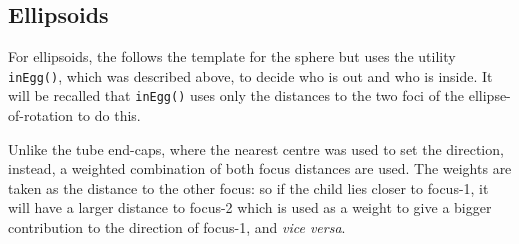 \subsection{Ellipsoids}

For ellipsoids, the  follows the template for the sphere but uses the utility {\tt inEgg()},
which was described above, to decide who is out and who is inside.   It will be recalled that
{\tt inEgg()} uses only the distances to the two foci of the ellipse-of-rotation to do this.

Unlike the tube end-caps, where the nearest centre was used to set the direction, instead, a
weighted combination of both focus distances are used.   The weights are taken as the distance to
the other focus: so if the child lies closer to focus-1, it will have a larger distance to focus-2
which is used as a weight to give a bigger contribution to the direction of focus-1, and {\em vice versa}. 

